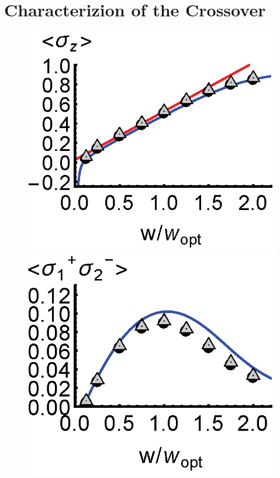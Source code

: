 \documentclass[aps,prl,twocolumn,
superscriptaddress,groupedaddress]{revtex4}
\begin{document}


\section{Characterizion of the Crossover}

\begin{figure}
\begin{center}
	\includegraphics[scale =0.38] {N40SuperradianceSZ.eps}
	\hspace{-5.0mm} \includegraphics[scale =0.38] {N40SuperradianceSPSM.eps}

\end{center}
\end{figure}
\end{document}
